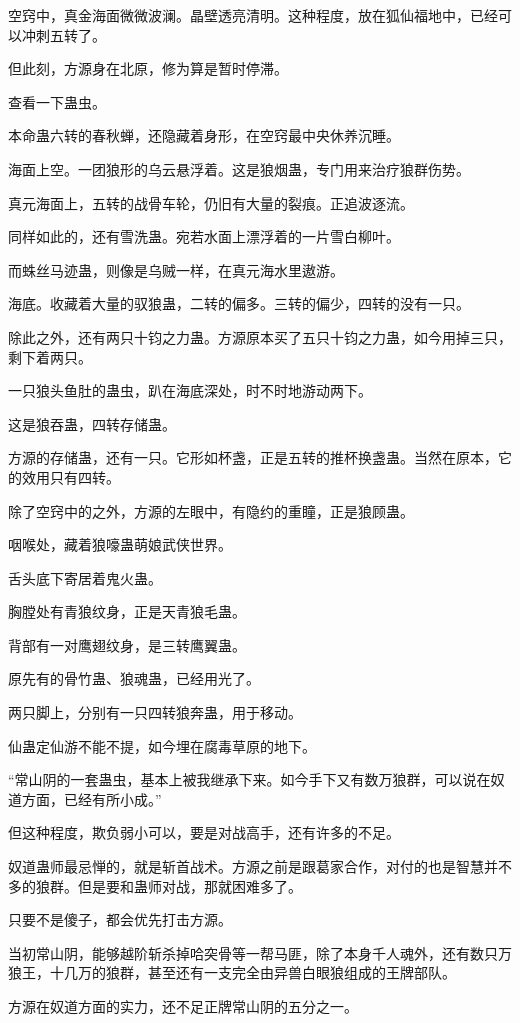 \begin{this_body}
空窍中，真金海面微微波澜。晶壁透亮清明。这种程度，放在狐仙福地中，已经可以冲刺五转了。

但此刻，方源身在北原，修为算是暂时停滞。

查看一下蛊虫。

本命蛊六转的春秋蝉，还隐藏着身形，在空窍最中央休养沉睡。

海面上空。一团狼形的乌云悬浮着。这是狼烟蛊，专门用来治疗狼群伤势。

真元海面上，五转的战骨车轮，仍旧有大量的裂痕。正追波逐流。

同样如此的，还有雪洗蛊。宛若水面上漂浮着的一片雪白柳叶。

而蛛丝马迹蛊，则像是乌贼一样，在真元海水里遨游。

海底。收藏着大量的驭狼蛊，二转的偏多。三转的偏少，四转的没有一只。

除此之外，还有两只十钧之力蛊。方源原本买了五只十钧之力蛊，如今用掉三只，剩下着两只。

一只狼头鱼肚的蛊虫，趴在海底深处，时不时地游动两下。

这是狼吞蛊，四转存储蛊。

方源的存储蛊，还有一只。它形如杯盏，正是五转的推杯换盏蛊。当然在原本，它的效用只有四转。

除了空窍中的之外，方源的左眼中，有隐约的重瞳，正是狼顾蛊。

咽喉处，藏着狼嚎蛊萌娘武侠世界。

舌头底下寄居着鬼火蛊。

胸膛处有青狼纹身，正是天青狼毛蛊。

背部有一对鹰翅纹身，是三转鹰翼蛊。

原先有的骨竹蛊、狼魂蛊，已经用光了。

两只脚上，分别有一只四转狼奔蛊，用于移动。

仙蛊定仙游不能不提，如今埋在腐毒草原的地下。

“常山阴的一套蛊虫，基本上被我继承下来。如今手下又有数万狼群，可以说在奴道方面，已经有所小成。”

但这种程度，欺负弱小可以，要是对战高手，还有许多的不足。

奴道蛊师最忌惮的，就是斩首战术。方源之前是跟葛家合作，对付的也是智慧并不多的狼群。但是要和蛊师对战，那就困难多了。

只要不是傻子，都会优先打击方源。

当初常山阴，能够越阶斩杀掉哈突骨等一帮马匪，除了本身千人魂外，还有数只万狼王，十几万的狼群，甚至还有一支完全由异兽白眼狼组成的王牌部队。

方源在奴道方面的实力，还不足正牌常山阴的五分之一。


\end{this_body}
